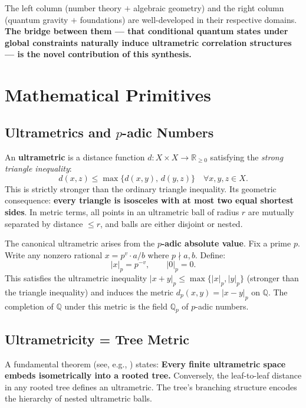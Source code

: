 \documentclass[12pt,a4paper]{article}
\theoremstyle{definition}
\newcommand{\R}{\mathbb{R}}
\newcommand{\Q}{\mathbb{Q}}
\newcommand{\Qp}{\mathbb{Q}_p}
\newcommand{\abs}[1]{\lvert#1\rvert}
\newcommand{\pval}[1]{\abs{#1}_p}
\newcommand{\distp}[2]{d_p(#1,#2)}
\begin{document}
The left column (number theory $+$ algebraic geometry) and the right column (quantum gravity $+$ foundations) are well-developed in their respective domains. \textbf{The bridge between them --- that conditional quantum states under global constraints naturally induce ultrametric correlation structures --- is the novel contribution of this synthesis.}

\section{Mathematical Primitives}

\subsection{Ultrametrics and $p$-adic Numbers}

An \textbf{ultrametric} is a distance function $d: X \times X \to \R_{\ge 0}$ satisfying the \emph{strong triangle inequality}:
\begin{equation}
d(x,z) \le \max\{d(x,y),\, d(y,z)\} \quad \forall x,y,z \in X.
\end{equation}
This is strictly stronger than the ordinary triangle inequality. Its geometric consequence: \textbf{every triangle is isosceles with at most two equal shortest sides}. In metric terms, all points in an ultrametric ball of radius $r$ are mutually separated by distance $\le r$, and balls are either disjoint or nested.

The canonical ultrametric arises from the \textbf{$p$-adic absolute value}. Fix a prime $p$. Write any nonzero rational $x = p^v \cdot a/b$ where $p \nmid a,b$. Define:
\begin{equation}
\pval{x} = p^{-v}, \qquad \pval{0} = 0.
\end{equation}
This satisfies the ultrametric inequality $\pval{x+y} \le \max\{\pval{x}, \pval{y}\}$ (stronger than the triangle inequality) and induces the metric $\distp{x}{y} = \pval{x-y}$ on $\Q$. The completion of $\Q$ under this metric is the field $\Qp$ of $p$-adic numbers.

\subsection{Ultrametricity = Tree Metric}

A fundamental theorem (see, e.g., \cite{serre1980trees}) states: \textbf{Every finite ultrametric space embeds isometrically into a rooted tree.} Conversely, the leaf-to-leaf distance in any rooted tree defines an ultrametric. The tree's branching structure encodes the hierarchy of nested ultrametric balls.
\end{document}

